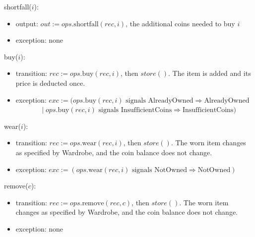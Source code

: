\documentclass[10pt, titlepage]{article}
\newcommand{\T}[1]{\mathit{#1}}          %
\newcommand{\out}{\mathit{out}}
\newcommand{\exc}{\mathit{exc}}
\begin{document}
\begin{samepage}
\noindent shortfall($i$):
\begin{itemize}
\item output: $\out := \T{ops}.\text{shortfall}(\T{rec}, i)$, the
  additional coins needed to buy $i$
\item exception: none
\end{itemize}
\end{samepage}
\par\pagebreak[0]

\begin{samepage}
\noindent buy($i$):
\begin{itemize}
\item transition: $\T{rec} := \T{ops}.\text{buy}(\T{rec}, i)$,
  then $\T{store}()$. The item is added and its price is deducted once.
\item exception: $\exc := (\T{ops}.\text{buy}(\T{rec}, i) \text{ signals
  AlreadyOwned} \Rightarrow \text{AlreadyOwned}$\\
  $\phantom{\exc := (}\mid \T{ops}.\text{buy}(\T{rec}, i) \text{ signals
  InsufficientCoins} \Rightarrow \text{InsufficientCoins})$
\end{itemize}
\end{samepage}
\par\pagebreak[0]

\begin{samepage}
\noindent wear($i$):
\begin{itemize}
\item transition: $\T{rec} := \T{ops}.\text{wear}(\T{rec}, i)$,
  then $\T{store}()$. The worn item changes as specified by Wardrobe, and the
  coin balance does not change.
\item exception: $\exc := (\T{ops}.\text{wear}(\T{rec}, i) \text{ signals
  NotOwned} \Rightarrow \text{NotOwned})$
\end{itemize}
\end{samepage}
\par\pagebreak[0]

\begin{samepage}
\noindent remove($c$):
\begin{itemize}
\item transition: $\T{rec} := \T{ops}.\text{remove}(\T{rec}, c)$,
  then $\T{store}()$. The worn item changes as specified by Wardrobe, and the
  coin balance does not change.
\item exception: none
\end{itemize}
\end{samepage}
\par\pagebreak[0]
\end{document}
